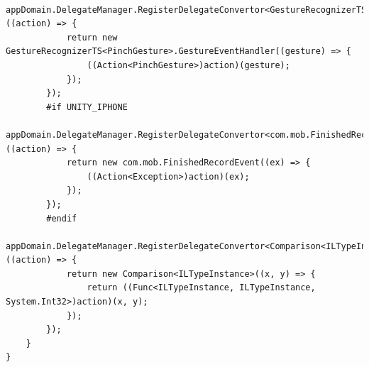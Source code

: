 \documentclass[9pt, b5paper]{article}
\begin{document}
\begin{verbatim}
        appDomain.DelegateManager.RegisterDelegateConvertor<GestureRecognizerTS<PinchGesture>.GestureEventHandler>((action) => {
            return new GestureRecognizerTS<PinchGesture>.GestureEventHandler((gesture) => {
                ((Action<PinchGesture>)action)(gesture);
            });
        });
        #if UNITY_IPHONE
                appDomain.DelegateManager.RegisterDelegateConvertor<com.mob.FinishedRecordEvent>((action) => {
            return new com.mob.FinishedRecordEvent((ex) => {
                ((Action<Exception>)action)(ex);
            });
        });
        #endif
        appDomain.DelegateManager.RegisterDelegateConvertor<Comparison<ILTypeInstance>>((action) => {
            return new Comparison<ILTypeInstance>((x, y) => {
                return ((Func<ILTypeInstance, ILTypeInstance, System.Int32>)action)(x, y);
            });
        });
    }
}
\end{verbatim}
\end{document}
